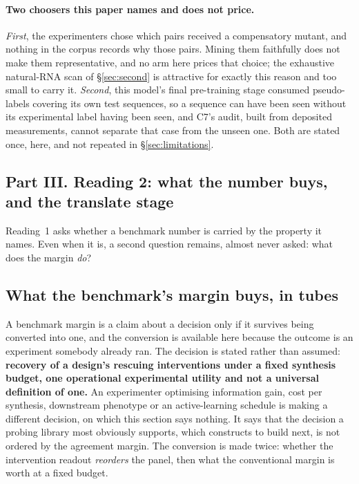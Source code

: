 \documentclass[11pt]{article}
\begin{document}
\paragraph{Two choosers this paper names and does not price.} \emph{First}, the experimenters chose
which pairs received a compensatory mutant, and nothing in the corpus records why those pairs.
Mining them faithfully does not make them representative, and no arm here prices that choice; the
exhaustive natural-RNA scan of \S\ref{sec:second} is attractive for exactly this reason and too
small to carry it. \emph{Second}, this model's final pre-training stage consumed pseudo-labels
covering its own test sequences, so a sequence can have been seen without its experimental label
having been seen, and C7's audit, built from deposited measurements, cannot separate that
case from the unseen one. Both are stated once, here, and not repeated in
\S\ref{sec:limitations}.

\subsection*{Part III. Reading 2: what the number buys, and the translate stage}

\noindent Reading~1 asks whether a benchmark number is carried by the property it names. Even when it is, a
second question remains, almost never asked: what does the margin \emph{do}?

\subsection{What the benchmark's margin buys, in tubes}
\label{sec:reorder}

A benchmark margin is a claim about a decision only if it survives being converted into one, and
the conversion is available here because the outcome is an experiment somebody already ran. The
decision is stated rather than assumed: \textbf{recovery of a design's rescuing interventions under
a fixed synthesis budget, one operational experimental utility and not a universal definition of
one.} An experimenter optimising information gain, cost per synthesis, downstream phenotype or an
active-learning schedule is making a different decision, on which this section says nothing. It says that the decision a probing library most obviously supports, which constructs to
build next, is not ordered by the agreement margin. The conversion is made twice: whether the
intervention readout \emph{reorders} the panel, then what the conventional margin is worth at a
fixed budget.
\end{document}
